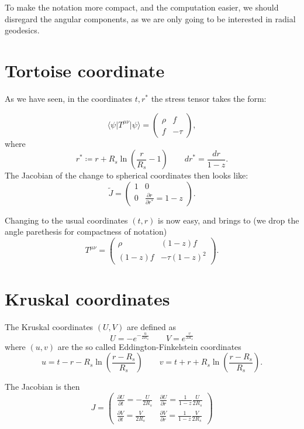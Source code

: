 To make the notation more compact, and the computation easier, we should disregard the angular components, as we are only going to be interested in radial geodesics.

\section{Tortoise coordinate}
As we have seen, in the coordinates \(t, r^*\) the stress tensor takes the form:

\[
    \langle\psi\vert T^{\mu\nu}\vert\psi\rangle = 
    \begin{pmatrix}
        \rho & f \\
        f & -\tau
    \end{pmatrix} ,
\]
where
\[
    r^* \coloneqq r + R_s\ln\left(\frac{r}{R_s} - 1\right)    \quad \quad dr^* = \frac{dr}{1 - z}.
\]
The Jacobian of the change to spherical coordinates then looks like:
\[
\tilde{J} = \begin{pmatrix}
    1 & 0 \\
    0 & \frac{\partial r}{\partial r^*} = 1 - z
\end{pmatrix}.   
\]

Changing to the usual coordinates \((t, r)\) is now easy, and brings to (we drop the angle parethesis for compactness of notation)
\[
   T^{\mu\nu} = \begin{pmatrix}
    \rho & (1 - z)f \\
    (1 - z)f  & -\tau(1 - z)^2
   \end{pmatrix}.
\]

\section{Kruskal coordinates}
The Kruskal coordinates \((U, V)\) are defined as 
\[
   U = - e^{-\frac{u}{2R_s}} \quad \quad V = e^{\frac{v}{2R_s}}
\]
where \((u,v)\) are the so called Eddington-Finkelstein coordinates
\[
u = t - r - R_s\ln\left(\frac{r - R_s}{R_s}\right)    \quad \quad 
v = t + r + R_s\ln\left(\frac{r - R_s}{R_s}\right).
\]

The Jacobian is then
\[
J = \begin{pmatrix}
    \frac{\partial U}{\partial t} = - \frac{U}{2R_s} & \frac{\partial U}{\partial r} = \frac{1}{1 - z} \frac{U}{2R_s} \\
    \frac{\partial V}{\partial t} = \frac{V}{2R_s} & \frac{\partial V}{\partial r} = \frac{1}{1 - z} \frac{V}{2R_s}
\end{pmatrix}    
\]

